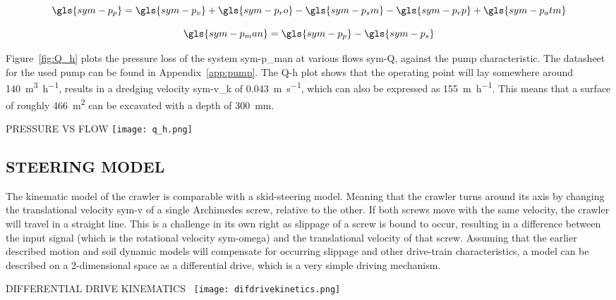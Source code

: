 \begin{equation}
    \label{eq:pressure_press}
    \gls{sym-p_p} = \gls{sym-p_v} + \gls{sym-p_ro} - \gls{sym-p_sm} - \gls{sym-p_rp} + \gls{sym-p_atm}
\end{equation}

\begin{equation}
    \label{eq:man_pressure}
    \gls{sym-p_man} = \gls{sym-p_p} - \gls{sym-p_s}
\end{equation}

Figure~\ref{fig:Q_h} plots the pressure loss of the system \gls{sym-p_man} at various flows \gls{sym-Q}, against the
pump characteristic. The datasheet for the used pump can be found in Appendix~\ref{app:pump}. The Q-h plot shows that
the operating point will lay somewhere around \SI{140}{\cubic\meter\per\hour}, results in a dredging velocity
\gls{sym-v_k} of \SI{0.043}{\meter\per\second}, which can also be expressed as \SI{155}{\meter\per\hour}. This means
that a surface of roughly \SI{466}{\meter\squared} can be excavated with a depth of \SI{300}{\milli\meter}.

\begin{RoyalFigure}[htb, label=fig:Q_h]{PRESSURE VS FLOW}
    \texttt{[image: q\_h.png]}
\end{RoyalFigure}

\subsection{STEERING MODEL}\label{sec:steering model}

The kinematic model of the crawler is comparable with a skid-steering model. Meaning that the crawler turns around its
axis by changing the translational velocity \gls{sym-v} of a single Archimedes screw, relative to the other. If both
screws move with the same velocity, the crawler will travel in a straight line. This is a challenge in its own right 
as slippage of a screw is bound to occur, resulting in a difference between the input signal (which is the rotational
velocity \gls{sym-omega}) and the translational velocity of that screw. Assuming that the earlier described motion and
soil dynamic models will compensate for occurring slippage and other drive-train characteristics, a model can be
described on a 2-dimensional space as a differential drive, which is a very simple driving mechanism.

\begin{RoyalFigure}[!htb, label=fig:difdrivekinetics]{DIFFERENTIAL DRIVE KINEMATICS~\cite{klancar_wheeled_2017}}
    \texttt{[image: difdrivekinetics.png]}
\end{RoyalFigure}

